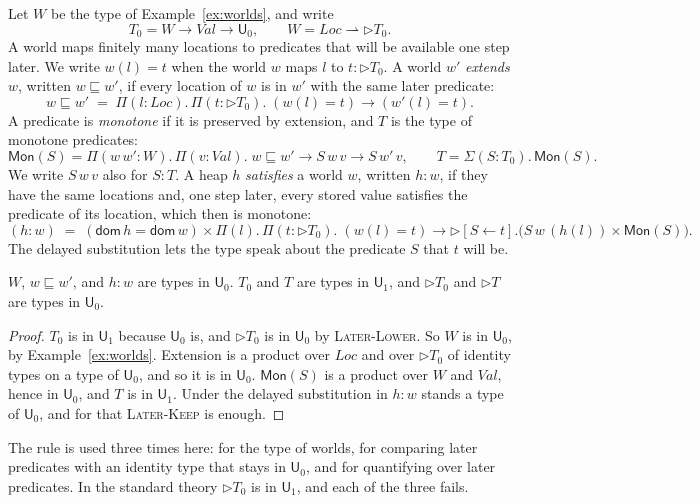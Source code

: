 \documentclass[acmsmall,nonacm,screen]{acmart}
\newcommand{\later}{{\triangleright}}
\newcommand{\Uv}{\mathsf{U}}
\newcommand{\kw}[1]{\mathsf{#1}}
\newcommand{\dsub}[2]{[#1 \leftarrow #2]}
\newcommand{\Loc}{\mathit{Loc}}
\newcommand{\Val}{\mathit{Val}}
\newcommand{\Wld}{W}
\newcommand{\Pred}{T}
\newcommand{\Mon}{\mathsf{Mon}}
\newcommand{\fmap}{\rightharpoonup}
\newcommand{\ext}{\sqsubseteq}
\begin{document}
Let $\Wld$ be the type of Example~\ref{ex:worlds}, and write
\[
  \Pred_0 = \Wld \to \Val \to \Uv_0, \qquad \Wld = \Loc \fmap \later \Pred_0 .
\]
A world maps finitely many locations to predicates that will be available one step later.
We write $w(l) = t$ when the world $w$ maps $l$ to $t : \later\Pred_0$. A world $w'$
\emph{extends} $w$, written $w \ext w'$, if every location of $w$ is in $w'$ with the same
later predicate:
\[
  w \ext w' \;=\; \Pi(l : \Loc).\,\Pi(t : \later \Pred_0).\; (w(l) = t) \to (w'(l) = t).
\]
A predicate is \emph{monotone} if it is preserved by extension, and $\Pred$ is the type of
monotone predicates:
\[
  \Mon(S) = \Pi(w\,w' : \Wld).\,\Pi(v : \Val).\; w \ext w' \to S\,w\,v \to S\,w'\,v,
  \qquad \Pred = \Sigma(S : \Pred_0).\,\Mon(S).
\]
We write $S\,w\,v$ also for $S : \Pred$. A heap $h$ \emph{satisfies} a world $w$, written
$h : w$, if they have the same locations and, one step later, every stored value satisfies
the predicate of its location, which then is monotone:
\[
  (h : w) \;=\; (\kw{dom}\,h = \kw{dom}\,w) \times
     \Pi(l).\,\Pi(t : \later\Pred_0).\; (w(l) = t) \to
        \later\dsub{S}{t}.\bigl(S\,w\,(h(l)) \times \Mon(S)\bigr).
\]
The delayed substitution lets the type speak about the predicate $S$ that $t$ will be.

\begin{proposition}[Sizes]\label{prop:sizes}
$\Wld$, $w \ext w'$, and $h : w$ are types in $\Uv_0$. $\Pred_0$ and $\Pred$ are types in
$\Uv_1$, and $\later\Pred_0$ and $\later\Pred$ are types in $\Uv_0$.
\end{proposition}

\begin{proof}
$\Pred_0$ is in $\Uv_1$ because $\Uv_0$ is, and $\later\Pred_0$ is in $\Uv_0$ by
\textsc{Later-Lower}. So $\Wld$ is in $\Uv_0$, by Example~\ref{ex:worlds}. Extension is a
product over $\Loc$ and over $\later\Pred_0$ of identity types on a type of $\Uv_0$, and so
it is in $\Uv_0$. $\Mon(S)$ is a product over $\Wld$ and $\Val$, hence in $\Uv_0$, and
$\Pred$ is in $\Uv_1$. Under the delayed substitution in $h : w$ stands a type of $\Uv_0$,
and for that \textsc{Later-Keep} is enough.
\end{proof}

The rule is used three times here: for the type of worlds, for comparing later predicates
with an identity type that stays in $\Uv_0$, and for quantifying over later predicates. In
the standard theory $\later\Pred_0$ is in $\Uv_1$, and each of the three fails.
\end{document}
